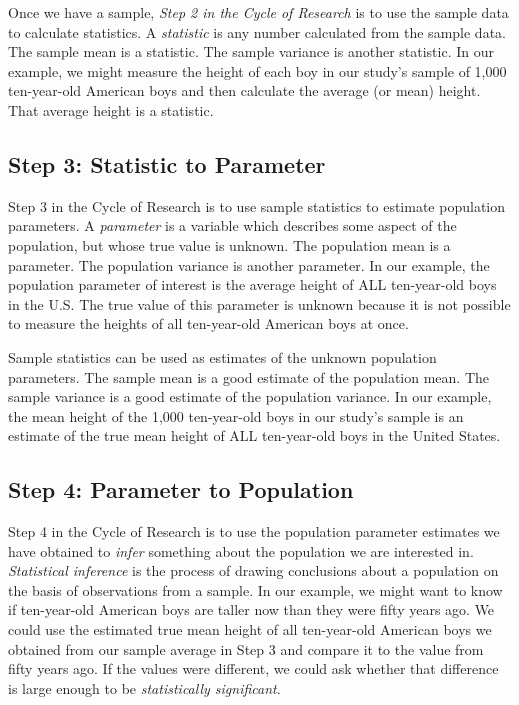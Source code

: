 \documentclass[
]{book}
\begin{document}
Once we have a sample, \emph{Step 2 in the Cycle of Research} is to use the sample data to calculate statistics. A \emph{statistic} is any number calculated from the sample data. The sample mean is a statistic. The sample variance is another statistic. In our example, we might measure the height of each boy in our study's sample of 1,000 ten-year-old American boys and then calculate the average (or mean) height. That average height is a statistic.

\hypertarget{step-3-statistic-to-parameter}{%
\subsection{Step 3: Statistic to Parameter}\label{step-3-statistic-to-parameter}}

Step 3 in the Cycle of Research is to use sample statistics to estimate population parameters. A \emph{parameter} is a variable which describes some aspect of the population, but whose true value is unknown. The population mean is a parameter. The population variance is another parameter. In our example, the population parameter of interest is the average height of ALL ten-year-old boys in the U.S. The true value of this parameter is unknown because it is not possible to measure the heights of all ten-year-old American boys at once.

Sample statistics can be used as estimates of the unknown population parameters. The sample mean is a good estimate of the population mean. The sample variance is a good estimate of the population variance. In our example, the mean height of the 1,000 ten-year-old boys in our study's sample is an estimate of the true mean height of ALL ten-year-old boys in the United States.

\hypertarget{step-4-parameter-to-population}{%
\subsection{Step 4: Parameter to Population}\label{step-4-parameter-to-population}}

Step 4 in the Cycle of Research is to use the population parameter estimates we have obtained to \emph{infer} something about the population we are interested in. \emph{Statistical inference} is the process of drawing conclusions about a population on the basis of observations from a sample. In our example, we might want to know if ten-year-old American boys are taller now than they were fifty years ago. We could use the estimated true mean height of all ten-year-old American boys we obtained from our sample average in Step 3 and compare it to the value from fifty years ago. If the values were different, we could ask whether that difference is large enough to be \emph{statistically significant}.
\end{document}
